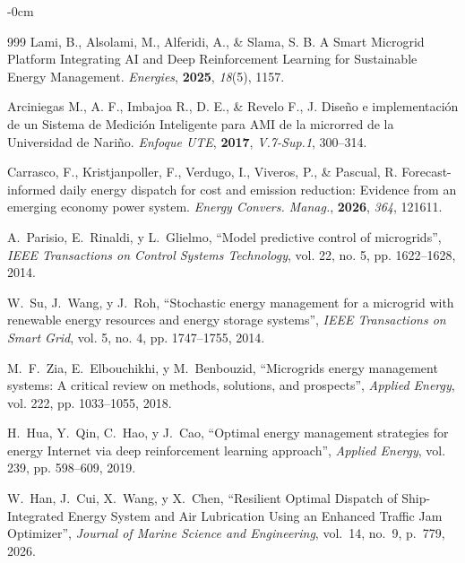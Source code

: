 \documentclass[journal,article,submit,pdftex,moreauthors]{Definitions/mdpi}
\begin{document}
\begin{adjustwidth}{-\extralength}{0cm}
\begin{thebibliography}{999}
Lami, B., Alsolami, M., Alferidi, A., \& Slama, S. B. A Smart Microgrid Platform Integrating AI and Deep Reinforcement Learning for Sustainable Energy Management. \textit{Energies}, \textbf{2025}, \textit{18}(5), 1157.

Arciniegas M., A. F., Imbajoa R., D. E., \& Revelo F., J. Dise\~no e implementaci\'on de un Sistema de Medici\'on Inteligente para AMI de la microrred de la Universidad de Nari\~no. \textit{Enfoque UTE}, \textbf{2017}, \textit{V.7-Sup.1}, 300--314.

Carrasco, F., Kristjanpoller, F., Verdugo, I., Viveros, P., \& Pascual, R. Forecast-informed daily energy dispatch for cost and emission reduction: Evidence from an emerging economy power system. \textit{Energy Convers. Manag.}, \textbf{2026}, \textit{364}, 121611.

A.~Parisio, E.~Rinaldi, y L.~Glielmo, ``Model predictive control of microgrids'', \emph{IEEE Transactions on Control Systems Technology}, vol. 22, no. 5, pp. 1622--1628, 2014.

W.~Su, J.~Wang, y J.~Roh, ``Stochastic energy management for a microgrid with renewable energy resources and energy storage systems'', \emph{IEEE Transactions on Smart Grid}, vol. 5, no. 4, pp. 1747--1755, 2014.

M.~F.~Zia, E.~Elbouchikhi, y M.~Benbouzid, ``Microgrids energy management systems: A critical review on methods, solutions, and prospects'', \emph{Applied Energy}, vol. 222, pp. 1033--1055, 2018.

H.~Hua, Y.~Qin, C.~Hao, y J.~Cao, ``Optimal energy management strategies for energy Internet via deep reinforcement learning approach'', \emph{Applied Energy}, vol. 239, pp. 598--609, 2019.

W.~Han, J.~Cui, X.~Wang, y X.~Chen, ``Resilient Optimal Dispatch of Ship-Integrated Energy System and Air Lubrication Using an Enhanced Traffic Jam Optimizer'', \emph{Journal of Marine Science and Engineering}, vol.~14, no.~9, p.~779, 2026.

\end{thebibliography}
\PublishersNote{}
\end{adjustwidth}
\end{document}
